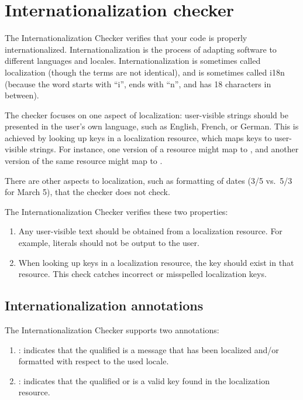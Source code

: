 \htmlhr
\chapter{Internationalization checker\label{i18n-checker}}

The Internationalization Checker verifies that your code is properly
internationalized.  Internationalization is the process of adapting
software to different languages and locales.  Internationalization is
sometimes called localization (though the terms are not identical), and is
sometimes called i18n (because the word starts with ``i'', ends with ``n'',
and has 18 characters in between).

The checker focuses on one aspect of localization:  user-visible strings
should be presented in the user's own language, such as English, French, or
German.  This is achieved by looking up keys in a localization resource,
which maps keys to user-visible strings.  For instance, one version of a
resource might map  to
, and another version of the same resource might map
 to .

There are other aspects to localization, such as formatting of dates (3/5
vs.~5/3 for March 5), that the checker does not check.

The Internationalization Checker verifies these two properties:

\begin{enumerate}

\item
  Any user-visible text should be obtained from a localization resource.
  For example,  literals should not be output to the user.

\item
  When looking up keys in a localization resource, the key should exist in
  that resource.  This check catches incorrect or misspelled localization
  keys.

\end{enumerate}


\section{Internationalization annotations\label{i18n-annotations}}

The Internationalization Checker supports two annotations:

\begin{enumerate}
\item {}: indicates that the qualified
 is a message that has been localized and/or formatted with
respect to the used locale.

\item {}: indicates that the
qualified  or  is a valid key found in the
localization resource.
\end{enumerate}

